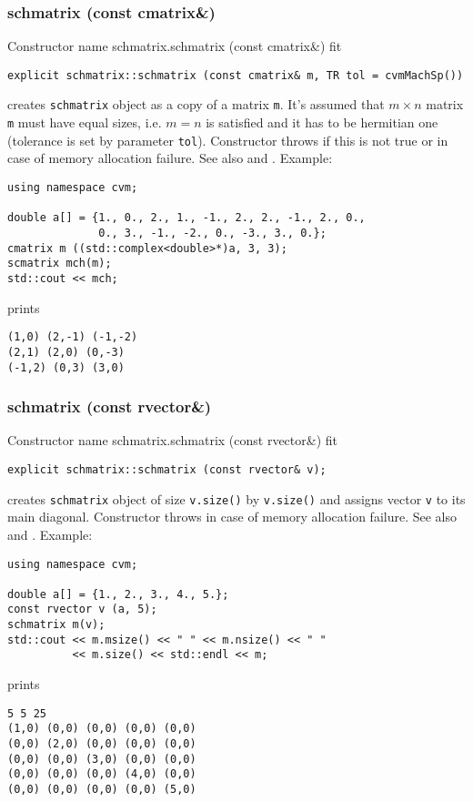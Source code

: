 \subsubsection{schmatrix (const cmatrix\&)}
Constructor%
\pdfdest name {schmatrix.schmatrix (const cmatrix&)} fit
\begin{verbatim}
explicit schmatrix::schmatrix (const cmatrix& m, TR tol = cvmMachSp())
\end{verbatim}
creates  \verb"schmatrix" object as a copy of a matrix \verb"m".
It's assumed that $m\times n$ matrix \verb"m" must have equal
sizes, i.e. $m = n$ is satisfied and it has to be  hermitian one
(tolerance is set by parameter \verb'tol').
Constructor throws  
if this is not true or in case of memory allocation failure.
See also  and .
Example:
\begin{Verbatim}
using namespace cvm;

double a[] = {1., 0., 2., 1., -1., 2., 2., -1., 2., 0.,
              0., 3., -1., -2., 0., -3., 3., 0.};
cmatrix m ((std::complex<double>*)a, 3, 3);
scmatrix mch(m);
std::cout << mch;
\end{Verbatim}
prints
\begin{Verbatim}
(1,0) (2,-1) (-1,-2)
(2,1) (2,0) (0,-3)
(-1,2) (0,3) (3,0)
\end{Verbatim}
\newpage




\subsubsection{schmatrix (const rvector\&)}
Constructor%
\pdfdest name {schmatrix.schmatrix (const rvector&)} fit
\begin{verbatim}
explicit schmatrix::schmatrix (const rvector& v);
\end{verbatim}
creates  \verb"schmatrix" object
of size \verb"v.size()" by \verb"v.size()"
and assigns vector \verb"v" to its main diagonal.
Constructor throws  
in case of memory allocation failure.
See also  and .
Example:
\begin{Verbatim}
using namespace cvm;

double a[] = {1., 2., 3., 4., 5.};
const rvector v (a, 5);
schmatrix m(v);
std::cout << m.msize() << " " << m.nsize() << " " 
          << m.size() << std::endl << m;
\end{Verbatim}
prints
\begin{Verbatim}
5 5 25
(1,0) (0,0) (0,0) (0,0) (0,0)
(0,0) (2,0) (0,0) (0,0) (0,0)
(0,0) (0,0) (3,0) (0,0) (0,0)
(0,0) (0,0) (0,0) (4,0) (0,0)
(0,0) (0,0) (0,0) (0,0) (5,0)
\end{Verbatim}
\newpage



